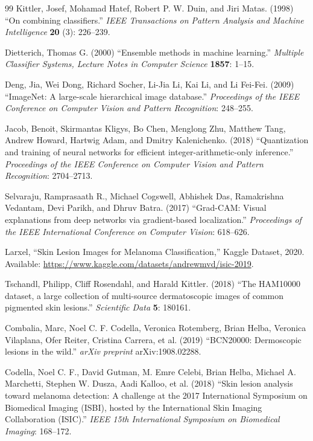 \documentclass[3p,times,procedia]{elsarticle}
\begin{document}
\begin{thebibliography}{99}
Kittler, Josef, Mohamad Hatef, Robert P. W. Duin, and Jiri Matas. (1998) ``On combining classifiers.'' {\it IEEE Transactions on Pattern Analysis and Machine Intelligence} {\bf 20} (3): 226--239.

Dietterich, Thomas G. (2000) ``Ensemble methods in machine learning.'' {\it Multiple Classifier Systems, Lecture Notes in Computer Science} {\bf 1857}: 1--15.

Deng, Jia, Wei Dong, Richard Socher, Li-Jia Li, Kai Li, and Li Fei-Fei. (2009) ``ImageNet: A large-scale hierarchical image database.'' {\it Proceedings of the IEEE Conference on Computer Vision and Pattern Recognition}: 248--255.

Jacob, Benoit, Skirmantas Kligys, Bo Chen, Menglong Zhu, Matthew Tang, Andrew Howard, Hartwig Adam, and Dmitry Kalenichenko. (2018) ``Quantization and training of neural networks for efficient integer-arithmetic-only inference.'' {\it Proceedings of the IEEE Conference on Computer Vision and Pattern Recognition}: 2704--2713.

Selvaraju, Ramprasaath R., Michael Cogswell, Abhishek Das, Ramakrishna Vedantam, Devi Parikh, and Dhruv Batra. (2017) ``Grad-CAM: Visual explanations from deep networks via gradient-based localization.'' {\it Proceedings of the IEEE International Conference on Computer Vision}: 618--626.

Larxel, ``Skin Lesion Images for Melanoma Classification,'' Kaggle Dataset, 2020. Available: \url{https://www.kaggle.com/datasets/andrewmvd/isic-2019}.

Tschandl, Philipp, Cliff Rosendahl, and Harald Kittler. (2018) ``The HAM10000 dataset, a large collection of multi-source dermatoscopic images of common pigmented skin lesions.'' {\it Scientific Data} {\bf 5}: 180161.

Combalia, Marc, Noel C. F. Codella, Veronica Rotemberg, Brian Helba, Veronica Vilaplana, Ofer Reiter, Cristina Carrera, et al. (2019) ``BCN20000: Dermoscopic lesions in the wild.'' {\it arXiv preprint} arXiv:1908.02288.

Codella, Noel C. F., David Gutman, M. Emre Celebi, Brian Helba, Michael A. Marchetti, Stephen W. Dusza, Aadi Kalloo, et al. (2018) ``Skin lesion analysis toward melanoma detection: A challenge at the 2017 International Symposium on Biomedical Imaging (ISBI), hosted by the International Skin Imaging Collaboration (ISIC).'' {\it IEEE 15th International Symposium on Biomedical Imaging}: 168--172.


\end{thebibliography}
\end{document}
